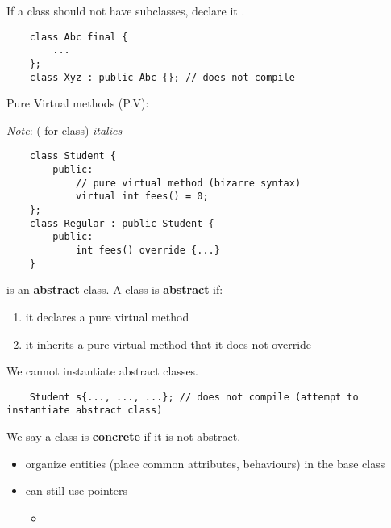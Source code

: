 If a class should not have subclasses, declare it .
\begin{lstlisting}
    class Abc final {
        ...
    };
    class Xyz : public Abc {}; // does not compile
\end{lstlisting}

Pure Virtual methods (P.V):
\begin{figure}[H]
    \centering
\end{figure}

\emph{Note}:  ( for class) \textrightarrow{} \emph{italics}

\begin{lstlisting}
    class Student {
        public:
            // pure virtual method (bizarre syntax)
            virtual int fees() = 0;
    };
    class Regular : public Student {
        public:
            int fees() override {...}
    }
\end{lstlisting}

 is an \textbf{abstract} class. A class is \textbf{abstract}
if:
\begin{enumerate}[label=(\arabic*)]
    \item it declares a pure virtual method
    \item it inherits a pure virtual method that it does not override
\end{enumerate}
We cannot instantiate abstract classes.
\begin{lstlisting}
    Student s{..., ..., ...}; // does not compile (attempt to instantiate abstract class)
\end{lstlisting}
We say a class is \textbf{concrete} if it is not abstract.
\begin{itemize}
    \item organize entities (place common attributes, behaviours)
          in the base class
    \item can still use  pointers
          \begin{itemize}
              \item {}
          \end{itemize}
\end{itemize}
